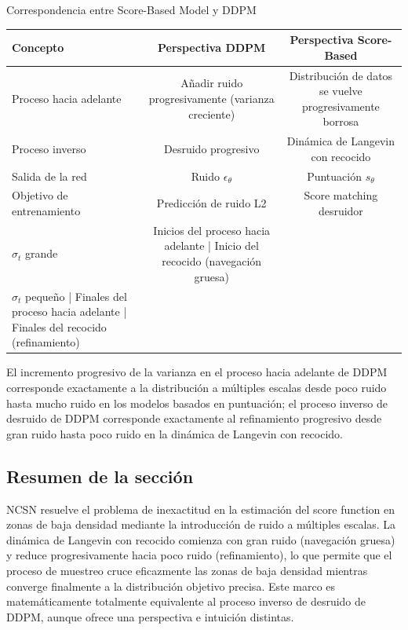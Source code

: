 \begin{importantbox}{Correspondencia entre Score-Based Model y DDPM}
\begin{center}
\begin{tabular}{lcc}
\toprule
\textbf{Concepto} & \textbf{Perspectiva DDPM} & \textbf{Perspectiva Score-Based} \\
\midrule
Proceso hacia adelante & Añadir ruido progresivamente (varianza creciente) & Distribución de datos se vuelve progresivamente borrosa \\
Proceso inverso & Desruido progresivo & Dinámica de Langevin con recocido \\
Salida de la red & Ruido $\epsilon_\theta$ & Puntuación $s_\theta$ \\
Objetivo de entrenamiento & Predicción de ruido L2 & Score matching desruidor \\
$\sigma_t$ grande & Inicios del proceso hacia adelante | Inicio del recocido (navegación gruesa) \\
$\sigma_t$ pequeño | Finales del proceso hacia adelante | Finales del recocido (refinamiento) \\
\bottomrule
\end{tabular}
\end{center}
El incremento progresivo de la varianza en el proceso hacia adelante de DDPM corresponde exactamente a la distribución a múltiples escalas desde poco ruido hasta mucho ruido en los modelos basados en puntuación; el proceso inverso de desruido de DDPM corresponde exactamente al refinamiento progresivo desde gran ruido hasta poco ruido en la dinámica de Langevin con recocido.
\end{importantbox}

\subsection{Resumen de la sección}

NCSN resuelve el problema de inexactitud en la estimación del score function en zonas de baja densidad mediante la introducción de ruido a múltiples escalas. La dinámica de Langevin con recocido comienza con gran ruido (navegación gruesa) y reduce progresivamente hacia poco ruido (refinamiento), lo que permite que el proceso de muestreo cruce eficazmente las zonas de baja densidad mientras converge finalmente a la distribución objetivo precisa. Este marco es matemáticamente totalmente equivalente al proceso inverso de desruido de DDPM, aunque ofrece una perspectiva e intuición distintas.
